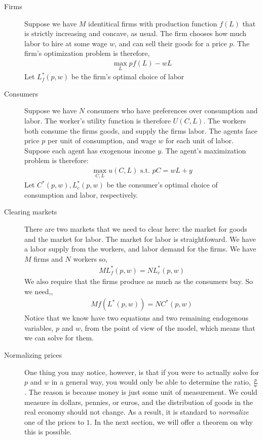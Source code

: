 \begin{description}
    \item[Firms] Suppose we have $M$ identitical firms with production function $f(L)$ that is strictly increasing and concave, as usual. The firm chooses how much labor to hire at some wage $w$, and can sell their goods for a price $p$. The firm's optimization problem is therefore,
    \begin{align*}
        \max_{L} p f(L) - wL
    \end{align*}  
    Let $L_{f}^*(p, w)$ be the firm's optimal choice of labor
    \item[Consumers] Suppose we have $N$ consumers who have preferences over consumption and labor. The worker's utility function is therefore $U(C, L)$. The workers both consume the firms goods, and supply the firms labor. The agents face price $p$ per unit of consumption, and wage $w$ for each unit of labor. Suppose each agent has exogenous income $y$. The agent's maximization problem is therefore:
    \begin{align*}
        \max_{C, L} u(C, L) \text{ s.t. } pC = wL + y
    \end{align*} 
    Let $C^*(p, w), L_{c}^*(p, w)$ be the consumer's optimal choice of consumption and labor, respectively. 
    \item[Clearing markets] There are two markets that we need to clear here: the market for goods and the market for labor. The market for labor is straightfoward. We have a labor supply from the workers, and labor demand for the firms. We have $M$ firms and $N$ workers so, 
    \begin{align*}
        M L_{f}^*(p, w) = N L_{c}^*(p, w)
    \end{align*} 
    We also require that the firms produce as much as the consumers buy. So we need,,
    \begin{align*}
        M f(L^*(p, w)) = N C^*(p, w)
    \end{align*}
    Notice that we know have two equations and two remaining endogenous variables, $p$ and $w$, from the point of view of the model, which means that we can solve for them.
    \item[Normalizing prices] One thing you may notice, however, is that if you were to actually solve for $p$ and $w$ in a general way, you would only be able to determine the ratio, $\frac{p}{w}$. The reason is because money is just some unit of measurement. We could measure in dollars, pennies, or euros, and the distribution of goods in the real economy should not change. As a result, it is standard to \emph{normalize} one of the prices to $1$. In the next section, we will offer a theorem on why this is possible. 

\end{description}
